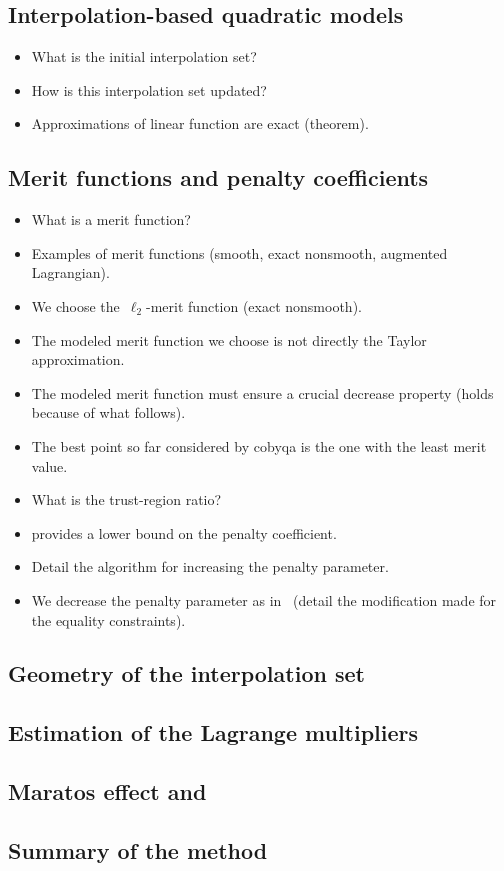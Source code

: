 \subsection{Interpolation-based quadratic models}
\label{subsec:cobyqa-models}

\begin{itemize}
    \item What is the initial interpolation set?
    \item How is this interpolation set updated?
    \item Approximations of linear function are exact (theorem).
\end{itemize}

\subsection{Merit functions and penalty coefficients}
\label{subsec:cobyqa-merit-function}

\begin{itemize}
    \item What is a merit function?
    \item Examples of merit functions (smooth, exact nonsmooth, augmented Lagrangian).
    \item We choose the~$\ell_2$-merit function (exact nonsmooth).
    \item The modeled merit function we choose is not directly the Taylor approximation.
    \item The modeled merit function must ensure a crucial decrease property (holds because of what follows).
    \item The best point so far considered by \gls{cobyqa} is the one with the least merit value.
    \item What is the trust-region ratio?
    \item \Cite[Thm.~14.5.1]{Conn_Gould_Toint_2000} provides a lower bound on the penalty coefficient.
    \item Detail the algorithm for increasing the penalty parameter.
    \item We decrease the penalty parameter as in~\cite{Powell_1994} (detail the modification made for the equality constraints).
\end{itemize}

\subsection{Geometry of the interpolation set}

\subsection{Estimation of the Lagrange multipliers}

\subsection{Maratos effect and }

\subsection{Summary of the method}
